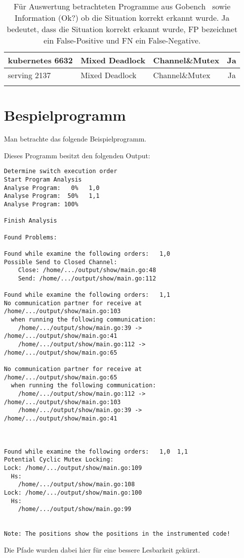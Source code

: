 \begin{longtable}[c]{|l|l|l|c|}
  kubernetes 6632      & Mixed Deadlock         & Channel\&Mutex         & Ja                                   \\ \hline
  serving 2137      & Mixed Deadlock         & Channel\&Mutex         & Ja                                   \\ \hline
  \caption{Für Auswertung betrachteten 
  Programme aus Gobench~\cite{gobench} sowie 
  Information (Ok?) ob die Situation korrekt erkannt wurde. Ja bedeutet, dass 
  die Situation korrekt erkannt wurde, FP bezeichnet ein False-Positive
  und FN ein False-Negative. }
  \label{App-Goker}
  \end{longtable}


\chapter{Bespielprogramm}\label{Appendix-2}
Man betrachte das folgende Beispielprogramm.
  
% 
% 

Dieses Programm besitzt den folgenden Output:
\begin{verbatim}
Determine switch execution order
Start Program Analysis
Analyse Program:   0%   1,0
Analyse Program:  50%   1,1
Analyse Program: 100%

Finish Analysis

Found Problems:

Found while examine the following orders:   1,0
Possible Send to Closed Channel:
    Close: /home/.../output/show/main.go:48
    Send: /home/.../output/show/main.go:112

Found while examine the following orders:   1,1
No communication partner for receive at /home/.../output/show/main.go:103 
  when running the following communication:
    /home/.../output/show/main.go:39 -> /home/.../output/show/main.go:41
    /home/.../output/show/main.go:112 -> /home/.../output/show/main.go:65

No communication partner for receive at /home/.../output/show/main.go:65 
  when running the following communication:
    /home/.../output/show/main.go:112 -> /home/.../output/show/main.go:103
    /home/.../output/show/main.go:39 -> /home/.../output/show/main.go:41



Found while examine the following orders:   1,0  1,1
Potential Cyclic Mutex Locking:
Lock: /home/.../output/show/main.go:109
  Hs:
    /home/.../output/show/main.go:108
Lock: /home/.../output/show/main.go:100
  Hs:
    /home/.../output/show/main.go:99


Note: The positions show the positions in the instrumented code!
\end{verbatim}
Die Pfade wurden dabei hier für eine bessere Lesbarkeit gekürzt. 
